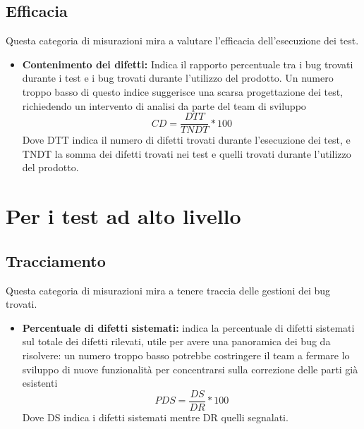 \documentclass[PianoDiProgetto.tex]{subfiles}
\begin{document}
\subsection{Efficacia}
Questa categoria di misurazioni mira a valutare l'efficacia dell'esecuzione dei test.
\begin{itemize}
	\item \textbf{Contenimento dei difetti:} Indica il rapporto percentuale tra i bug trovati durante i test e i bug trovati durante l'utilizzo del prodotto. Un numero troppo basso di questo indice suggerisce una scarsa progettazione dei test, richiedendo un intervento di analisi da parte del team di sviluppo
	\[CD=\dfrac{DTT}{TNDT}*100\]
	Dove DTT indica il numero di difetti trovati durante l'esecuzione dei test, e TNDT la somma dei difetti trovati nei test e quelli trovati durante l'utilizzo del prodotto.
\end{itemize}
\section{Per i test ad alto livello}
\subsection{Tracciamento}
Questa categoria di misurazioni mira a tenere traccia delle gestioni dei bug trovati.
\begin{itemize}
	\item \textbf{Percentuale di difetti sistemati:} indica la percentuale di difetti sistemati sul totale dei difetti rilevati, utile per avere una panoramica dei bug da risolvere: un numero troppo basso potrebbe costringere il team a fermare lo sviluppo di nuove funzionalità per concentrarsi sulla correzione delle parti già esistenti
	\[PDS=\dfrac{DS}{DR}*100\]
	Dove DS indica i difetti sistemati mentre DR quelli segnalati.	
\end{itemize}
\end{document}
